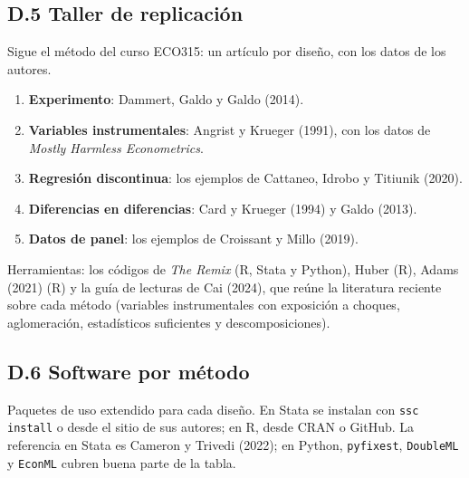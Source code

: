\documentclass[11pt,a4paper]{article}
\begin{document}
\subsection*{D.5 Taller de replicación}
Sigue el método del curso ECO315: un artículo por diseño, con los datos de los
autores.
\begin{enumerate}[leftmargin=1.6em,itemsep=2pt]
  \item \textbf{Experimento}: Dammert, Galdo y Galdo (2014).
  \item \textbf{Variables instrumentales}: Angrist y Krueger (1991), con los
        datos de \emph{Mostly Harmless Econometrics}.
  \item \textbf{Regresión discontinua}: los ejemplos de Cattaneo, Idrobo y
        Titiunik (2020).
  \item \textbf{Diferencias en diferencias}: Card y Krueger (1994) y Galdo (2013).
  \item \textbf{Datos de panel}: los ejemplos de Croissant y Millo (2019).
\end{enumerate}
Herramientas: los códigos de \emph{The Remix} (R, Stata y Python), Huber (R),
Adams (2021) (R) y la guía de lecturas de Cai (2024), que reúne la literatura
reciente sobre cada método (variables instrumentales con exposición a
choques, aglomeración, estadísticos suficientes y descomposiciones).

\subsection*{D.6 Software por método}
Paquetes de uso extendido para cada diseño. En Stata se instalan con
\texttt{ssc install} o desde el sitio de sus autores; en R, desde CRAN o
GitHub. La referencia en Stata es Cameron y Trivedi (2022); en Python,
\texttt{pyfixest}, \texttt{DoubleML} y \texttt{EconML} cubren buena parte de
la tabla.
\end{document}
